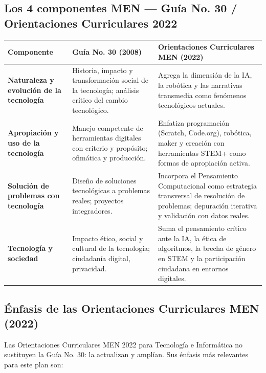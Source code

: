 \documentclass[12pt, a4paper]{article}
\begin{document}
\subsection{Los 4 componentes MEN — Guía No. 30 / Orientaciones Curriculares 2022}

\begin{center}
\setlength{\tabcolsep}{4pt}
\begin{tabular}{|L{3.5cm}|L{5cm}|L{5cm}|}
\hline
{}
\color{white}\textbf{Componente} &
\color{white}\textbf{Guía No. 30 (2008)} &
\color{white}\textbf{Orientaciones Curriculares MEN (2022)} \\
\hline
\textbf{Naturaleza y evolución de la tecnología} &
Historia, impacto y transformación social de la tecnología;
análisis crítico del cambio tecnológico. &
Agrega la dimensión de la IA, la robótica y las narrativas
transmedia como fenómenos tecnológicos actuales. \\
\hline
\textbf{Apropiación y uso de la tecnología} &
Manejo competente de herramientas digitales con criterio y
propósito; ofimática y producción. &
Enfatiza programación (Scratch, Code.org), robótica, maker y
creación con herramientas STEM+ como formas de apropiación
activa. \\
\hline
\textbf{Solución de problemas con tecnología} &
Diseño de soluciones tecnológicas a problemas reales;
proyectos integradores. &
Incorpora el Pensamiento Computacional como estrategia
transversal de resolución de problemas; depuración iterativa
y validación con datos reales. \\
\hline
\textbf{Tecnología y sociedad} &
Impacto ético, social y cultural de la tecnología;
ciudadanía digital, privacidad. &
Suma el pensamiento crítico ante la IA, la ética de
algoritmos, la brecha de género en STEM y la participación
ciudadana en entornos digitales. \\
\hline
\end{tabular}
\end{center}

\subsection{Énfasis de las Orientaciones Curriculares MEN (2022)}

Las Orientaciones Curriculares MEN 2022 para Tecnología e Informática no
sustituyen la Guía No. 30: la actualizan y amplían. Sus énfasis más relevantes
para este plan son:
\end{document}
